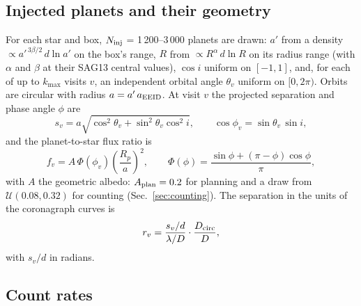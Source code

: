 \documentclass[11pt,a4paper]{article}
\begin{document}
\subsection{Injected planets and their geometry}

For each star and box, $N_{\rm inj}$ = 1\,200--3\,000 planets are drawn: $a'$ from a density
$\propto a'^{\,3\beta/2}\,d\ln a'$ on the box's range, $R$ from $\propto R^{\alpha}\,d\ln R$ on
its radius range (with $\alpha$ and $\beta$ at their SAG13 central values), $\cos i$ uniform on
$[-1, 1]$, and, for each of up to $k_{\max}$ visits $v$, an independent orbital angle $\theta_v$
uniform on $[0, 2\pi)$. Orbits are circular with radius $a = a'\,a_{\rm EEID}$. At visit $v$ the
projected separation and phase angle $\phi$ are
\begin{equation}
s_v = a\sqrt{\cos^2\theta_v + \sin^2\theta_v\cos^2 i}, \qquad
\cos\phi_v = \sin\theta_v\,\sin i,
\label{eq:geometry}
\end{equation}
and the planet-to-star flux ratio is
\begin{equation}
f_v = A\,\Phi(\phi_v)\left(\frac{R_p}{a}\right)^{2}, \qquad
\Phi(\phi) = \frac{\sin\phi + (\pi - \phi)\cos\phi}{\pi},
\label{eq:fluxratio}
\end{equation}
with $A$ the geometric albedo: $A_{\rm plan} = 0.2$ for planning and a draw from
$\mathcal{U}(0.08, 0.32)$ for counting (Sec.~\ref{sec:counting}). The separation in the units of
the coronagraph curves is
\begin{equation}
r_v = \frac{s_v/d}{\lambda/D}\cdot\frac{D_{\rm circ}}{D},
\label{eq:separation}
\end{equation}
with $s_v/d$ in radians.

\subsection{Count rates}
\end{document}
